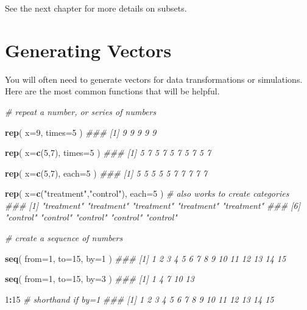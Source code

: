 \documentclass[]{book}
\newenvironment{Shaded}{\begin{snugshade}}{\end{snugshade}}
\newcommand{\CommentTok}[1]{\textcolor[rgb]{0.56,0.35,0.01}{\textit{#1}}}
\newcommand{\DataTypeTok}[1]{\textcolor[rgb]{0.13,0.29,0.53}{#1}}
\newcommand{\DecValTok}[1]{\textcolor[rgb]{0.00,0.00,0.81}{#1}}
\newcommand{\KeywordTok}[1]{\textcolor[rgb]{0.13,0.29,0.53}{\textbf{#1}}}
\newcommand{\NormalTok}[1]{#1}
\newcommand{\OperatorTok}[1]{\textcolor[rgb]{0.81,0.36,0.00}{\textbf{#1}}}
\newcommand{\StringTok}[1]{\textcolor[rgb]{0.31,0.60,0.02}{#1}}
\theoremstyle{definition}
\theoremstyle{definition}
\theoremstyle{definition}
\theoremstyle{remark}
\begin{document}
See the next chapter for more details on subsets.

\hypertarget{generating-vectors}{%
\section{Generating Vectors}\label{generating-vectors}}

You will often need to generate vectors for data transformations or
simulations. Here are the most common functions that will be helpful.

\begin{Shaded}
\begin{Highlighting}[]

\CommentTok{# repeat a number, or series of numbers}

\KeywordTok{rep}\NormalTok{( }\DataTypeTok{x=}\DecValTok{9}\NormalTok{, }\DataTypeTok{times=}\DecValTok{5}\NormalTok{ )}
\CommentTok{### [1] 9 9 9 9 9}

\KeywordTok{rep}\NormalTok{( }\DataTypeTok{x=}\KeywordTok{c}\NormalTok{(}\DecValTok{5}\NormalTok{,}\DecValTok{7}\NormalTok{), }\DataTypeTok{times=}\DecValTok{5}\NormalTok{ )}
\CommentTok{###  [1] 5 7 5 7 5 7 5 7 5 7}

\KeywordTok{rep}\NormalTok{( }\DataTypeTok{x=}\KeywordTok{c}\NormalTok{(}\DecValTok{5}\NormalTok{,}\DecValTok{7}\NormalTok{), }\DataTypeTok{each=}\DecValTok{5}\NormalTok{ )}
\CommentTok{###  [1] 5 5 5 5 5 7 7 7 7 7}

\KeywordTok{rep}\NormalTok{( }\DataTypeTok{x=}\KeywordTok{c}\NormalTok{(}\StringTok{"treatment"}\NormalTok{,}\StringTok{"control"}\NormalTok{), }\DataTypeTok{each=}\DecValTok{5}\NormalTok{ )  }\CommentTok{# also works to create categories}
\CommentTok{###  [1] "treatment" "treatment" "treatment" "treatment" "treatment"}
\CommentTok{###  [6] "control"   "control"   "control"   "control"   "control"}


\CommentTok{# create a sequence of numbers}

\KeywordTok{seq}\NormalTok{( }\DataTypeTok{from=}\DecValTok{1}\NormalTok{, }\DataTypeTok{to=}\DecValTok{15}\NormalTok{, }\DataTypeTok{by=}\DecValTok{1}\NormalTok{ )}
\CommentTok{###  [1]  1  2  3  4  5  6  7  8  9 10 11 12 13 14 15}

\KeywordTok{seq}\NormalTok{( }\DataTypeTok{from=}\DecValTok{1}\NormalTok{, }\DataTypeTok{to=}\DecValTok{15}\NormalTok{, }\DataTypeTok{by=}\DecValTok{3}\NormalTok{ )}
\CommentTok{### [1]  1  4  7 10 13}

\DecValTok{1}\OperatorTok{:}\DecValTok{15}   \CommentTok{# shorthand if by=1}
\CommentTok{###  [1]  1  2  3  4  5  6  7  8  9 10 11 12 13 14 15}




\end{Highlighting}
\end{Shaded}
\end{document}
